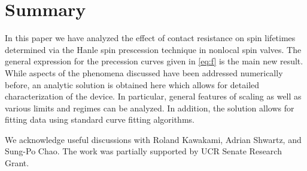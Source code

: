 \section{Summary}
\label{s:summary}

In this paper we have analyzed the effect of contact resistance
on spin lifetimes determined via the Hanle spin prescession technique in nonlocal spin valves.
The general expression for the precession curves given in \cref{eq:f} is the main new result.
While aspects of the phenomena discussed have been addressed numerically before,
an analytic solution is obtained here which allows for detailed characterization of the device.
In particular, general features of scaling as well as various limits and regimes can be analyzed.
In addition, the solution allows for fitting data using standard curve fitting algorithms.

We acknowledge useful discussions with Roland Kawakami, Adrian Shwartz, and Sung-Po Chao.
The work was partially supported by UCR Senate Research Grant.
